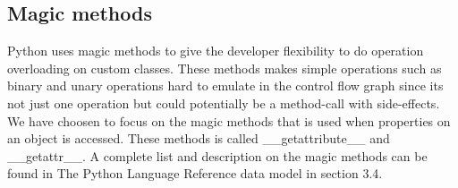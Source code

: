 \subsection{Magic methods}
Python uses magic methods to give the developer flexibility to do operation overloading on custom classes. These methods makes simple operations such as binary and unary operations hard to emulate in the control flow graph since its not just one operation but could potentially be a method-call with side-effects. \\
We have choosen to focus on the magic methods that is used when properties on an object is accessed. These methods is called \_\_getattribute\_\_ and \_\_getattr\_\_. A complete list and description on the magic methods can be found in The Python Language Reference data model\cite{pyref.datamodel} in section 3.4.
